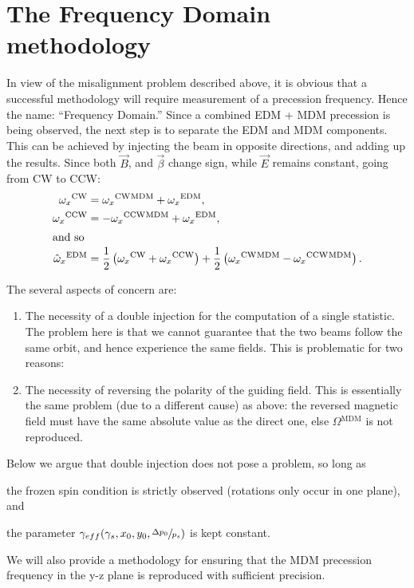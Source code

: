 \documentclass{article}
\newcommand{\W}{\Omega}
\newcommand{\w}{\omega}
\newcommand{\MDM}{{}^\mathrm{MDM}}
\newcommand{\EDM}{{}^\mathrm{EDM}}
\newcommand{\CW}{{}^\mathrm{CW}}
\newcommand{\CCW}{{}^\mathrm{CCW}}
\begin{document}
\section{The Frequency Domain methodology}
In view of the misalignment problem described above, it is obvious that a successful methodology will require measurement of a precession frequency. Hence the name: ``Frequency Domain.'' Since a combined EDM + MDM precession is being observed, the next step is to separate the EDM and MDM components. This can be achieved by injecting the beam in opposite directions, and adding up the results. Since both $\vec B$, and $\vec\beta$ change sign, while $\vec E$ remains constant, going from CW to CCW:
\begin{align}
  \w_x\CW &= \w_x\CW\MDM + \w_x\EDM, \\
  \w_x\CCW &= -\w_x\CCW\MDM + \w_x\EDM, \\
  \shortintertext{and so}
  \hat\w_x\EDM &= \frac12\bkt{\w_x\CW + \w_x\CCW} + \frac12\bkt{\w_x\CW\MDM - \w_x\CCW\MDM}.
\end{align}

The several aspects of concern are:
\begin{enumerate}
\item The necessity of a double injection for the computation of a single statistic. The problem here is that we cannot guarantee that the two beams follow the same orbit, and hence experience the same fields. This is problematic for two reasons: \label{itm:Injection}
  
  \item The necessity of reversing the polarity of the guiding field. This is essentially the same problem (due to a different cause) as above: the reversed magnetic field must have the same absolute value as the direct one, else $\W\MDM$ is not reproduced. \label{itm:Polarity}
\end{enumerate}

Below we argue that double injection does not pose a problem, so long as 
\begin{inparaenum}[a)]
\item the frozen spin condition is strictly observed (rotations only occur in one plane), and
\item the parameter $\gamma_{eff}(\gamma_s, x_0, y_0, \sfrac{\Delta p_0}{p_s})$ is kept constant.
\end{inparaenum}
We will also provide a methodology for ensuring that the MDM precession frequency in the y-z plane is reproduced with sufficient precision.
\end{document}
